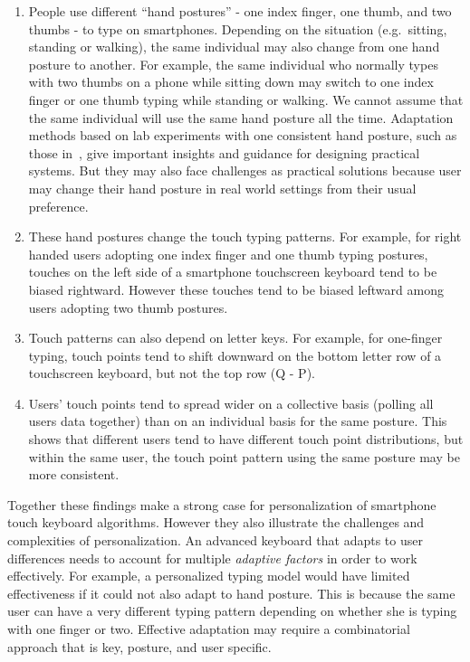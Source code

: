 \documentclass{sigchi}
\begin{document}
\begin{enumerate}
\item People use different ``hand postures'' - one index finger, one thumb, and
two thumbs - to type on smartphones. Depending on the situation (e.g.\ sitting,
standing or walking), the same individual may also change from one hand posture to another. For example, the same individual who normally types with two thumbs on a phone while sitting down may switch to one index finger or one thumb typing while standing or walking. We cannot assume that the same individual will use the same hand posture all the time. Adaptation methods based on lab experiments with one consistent hand  posture, such as those in~\cite{Findlater:2012}, give important insights and guidance for designing practical systems. But they may also face challenges as practical solutions because user may change their hand posture in real world settings from their usual preference.

\item These hand postures change the touch typing patterns. For example, for right handed users adopting one index finger and one thumb typing postures, touches on the left side of a smartphone touchscreen keyboard tend to be biased rightward. However these touches tend to be biased leftward among users adopting two thumb postures.

\item Touch patterns can also depend on letter keys. For example, for one-finger typing, touch points tend to shift downward on the bottom letter row of a touchscreen keyboard, but not the top row (Q - P). 

\item Users’ touch points tend to spread wider on a collective basis (polling all users data together) than on an individual basis for the same posture. This shows that different users tend to have different touch point distributions, but within the same user, the touch point pattern using the same posture may be more consistent.
\end{enumerate}

Together these findings make a strong case for personalization of smartphone touch keyboard algorithms. However they also illustrate the challenges and complexities of personalization. An advanced keyboard that adapts to user differences needs to account for multiple \textit{adaptive factors} in order to work effectively. For example, a personalized typing model would have limited effectiveness if it could not also adapt to hand posture. This is because the same user can have a very different typing pattern depending on whether she is typing with one finger or two. Effective adaptation may require a combinatorial approach that is key, posture, and user specific. 
\end{document}
